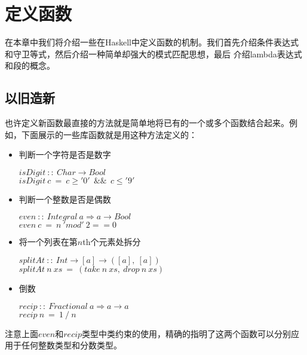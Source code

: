 \chapter{定义函数}
在本章中我们将介绍一些在Haskell中定义函数的机制。我们首先介绍条件表达式和守卫等式，然后介绍一种简单却强大的模式匹配思想，最后
介绍lambda表达式和段的概念。

\section{以旧造新}
也许定义新函数最直接的方法就是简单地将已有的一个或多个函数结合起来。例如，下面展示的一些库函数就是用这种方法定义的：

\begin{itemize}
\item 判断一个字符是否是数字

\hspace*{1cm} $isDigit~::~Char \rightarrow Bool$\\
\hspace*{1cm} $isDigit~c~=~c \geq '0'~~\&\&~~c \leq '9'$

\item 判断一个整数是否是偶数

\hspace*{1cm} $even~::~Integral~a \Rightarrow a \rightarrow Bool$\\
\hspace*{1cm} $even~c~=~n~'mod'~2 == 0$

\item 将一个列表在第$n$th个元素处拆分

\hspace*{1cm} $splitAt~::~Int \rightarrow [a] \rightarrow ([a],~[a])$\\
\hspace*{1cm} $splitAt~n~xs~=~(take~n~xs,~drop~n~xs)$

\item 倒数

\hspace*{1cm} $recip~::~Fractional~a \Rightarrow a \rightarrow a$\\
\hspace*{1cm} $recip~n~=~1~/~n$

\end{itemize}

注意上面$even$和$recip$类型中类约束的使用，精确的指明了这两个函数可以分别应用于任何整数类型和分数类型。


